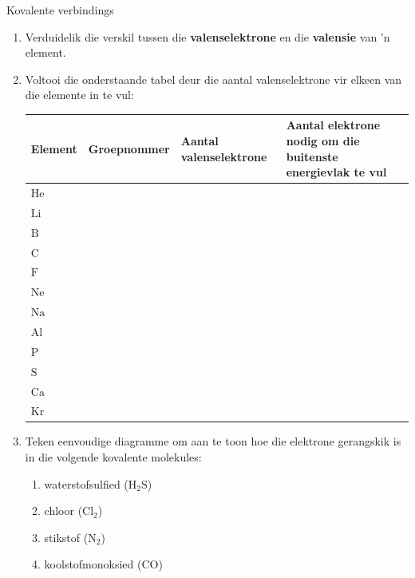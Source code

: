\begin{exercises}{Kovalente verbindings}
{
            \nopagebreak
        \label{m38704*id139588}\begin{enumerate}[noitemsep, label=\textbf{\arabic*}. ] 
            \label{m38704*uid10}\item Verduidelik die verskil tussen die \textbf{valenselektrone} en die \textbf{valensie} van 'n  element.
\label{m38704*uid11}\item Voltooi die onderstaande tabel deur die aantal valenselektrone vir elkeen van die elemente in te vul:
          \begin{table}[H]
        \begin{center}
      \label{m38704*id139625}
    \noindent
      \begin{tabular}{|l|l|p{3cm}|p{3cm}|}\hline
\textbf{Element} & \textbf{Groepnommer} & \textbf{Aantal valenselektrone} & \textbf{Aantal elektrone nodig om die buitenste energievlak te vul}  \\ \hline
        $\text{He}$ & & & \\ \hline
        $\text{Li}$ & & & \\ \hline
        $\text{B}$ & & & \\ \hline
        $\text{C}$ & & & \\ \hline
        $\text{F}$ & & & \\ \hline
        $\text{Ne}$ & & & \\ \hline
        $\text{Na}$ & & & \\ \hline
        $\text{Al}$ & & & \\ \hline
        $\text{P}$ & & & \\ \hline
        $\text{S}$ & & & \\ \hline
        $\text{Ca}$ & & & \\ \hline
        $\text{Kr}$ & & & \\ \hline
    \end{tabular}
      \end{center}
\end{table}
          \label{m38704*uid12}\item Teken eenvoudige diagramme om aan te toon hoe die elektrone gerangskik is in die volgende kovalente molekules:
\label{m38704*id140030}\begin{enumerate}[noitemsep, label=\textbf{\alph*}. ] 
            \label{m38704*uid13}\item waterstofsulfied ($\text{H}_{2}\text{S}$)
\label{m38704*uid14}\item chloor ($\text{Cl}_{2}$)
\item stikstof ($\text{N}_2$)
\item koolstofmonoksied ($\text{CO}$)
\end{enumerate}
                \end{enumerate}

}
\end{exercises}
